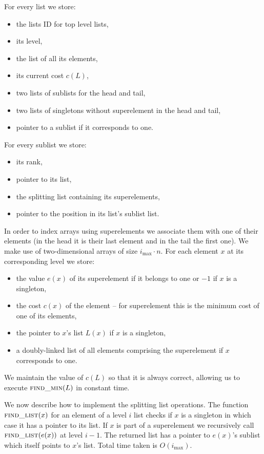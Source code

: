 For every list we store:

\begin{itemize}
    \item the lists ID for top level lists,
    \item its level,
    \item the list of all its elements,
    \item its current cost $c(L)$,
    \item two lists of sublists for the head and tail,
    \item two lists of singletons without superelement in the head and tail,
    \item pointer to a sublist if it corresponds to one.
\end{itemize}

For every sublist we store:

\begin{itemize}
    \item its rank,
    \item pointer to its list,
    \item the splitting list containing its superelements,
    \item pointer to the position in its list's sublist list.
\end{itemize}

In order to index arrays using superelements we associate them with one of their elements (in the head it is their last element and in the tail the first one). We make use of two-dimensional arrays of size $i_{\max} \cdot n$. For each element $x$ at its corresponding level we store:

\begin{itemize}
    \item the value $e(x)$ of its superelement if it belongs to one or $-1$ if $x$ is a singleton,
    \item the cost $c(x)$ of the element – for superelement this is the minimum cost of one of its elements,
    \item the pointer to $x$'s list $L(x)$ if $x$ is a singleton,
    \item a doubly-linked list of all elements comprising the superelement if $x$ corresponds to one.
\end{itemize}

We maintain the value of $c(L)$ so that it is always correct, allowing us to execute $\textsc{find\_min}(L)$ in constant time.

We now describe how to implement the splitting list operations. The function $\textsc{find\_list}(x)$ for an element of a level $i$ list checks if $x$ is a singleton in which case it has a pointer to its list. If $x$ is part of a superelement we recursively call $\textsc{find\_list}(e(x))$ at level $i-1$. The returned list has a pointer to $e(x)$'s sublist which itself points to $x$'s list. Total time taken is $O(i_{\max})$.

